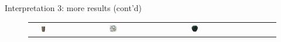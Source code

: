 \documentclass[10pt]{beamer}
\begin{document}
\begin{frame}{Interpretation 3: more results (cont'd)}
\begin{figure}
\begin{tabular}{c*{4}{l}}
& \includegraphics[width=0.1\textwidth]{interp/real_interp/cup/cup_ps}
& \includegraphics[width=0.1\textwidth]{interp/real_interp/pot/pot_sl}
& \includegraphics[width=0.1\textwidth]{interp/real_interp/vase/vase_mvs} \\
\end{tabular}
\end{figure}

\end{frame}
\end{document}
